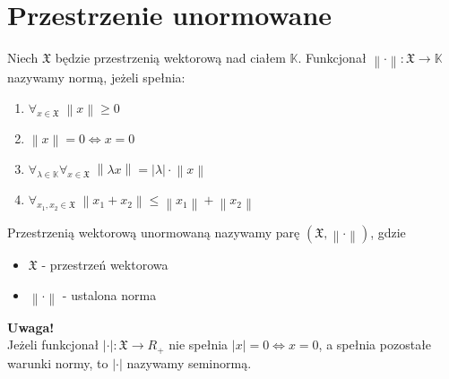 \section{Przestrzenie unormowane}
\begin{defi}[Norma]
Niech $ \mathfrak X $ będzie przestrzenią wektorową nad ciałem $ \mathbb K $. Funkcjonał $ \left\|\cdot \right\|:\mathfrak X\to \mathbb K $ nazywamy normą, jeżeli spełnia:
\begin{enumerate}
\item $ \forall_{x\in\mathfrak X}\; \left\|x\right\|\ge 0 $
\item $ \left\|x\right\|=0\Leftrightarrow x=0 $
\item $ \forall_{\lambda\in\mathbb K}\forall_{x\in \mathfrak X}\;\left\|\lambda x\right\|=\left|\lambda\right| \cdot \left\|x\right\|$
\item $ \forall_{x_1,x_2\in\mathfrak X}\;\left\|x_1+x_2\right\|\le \left\|x_1\right\| +\left\|x_2\right\|$
\end{enumerate}
\end{defi}
\begin{defi}
Przestrzenią wektorową unormowaną nazywamy parę $ \left(\mathfrak X,\left\|\cdot \right\|\right) $, gdzie
\begin{itemize}
\item $ \mathfrak X $ - przestrzeń wektorowa
\item $ \left\|\cdot \right\| $ - ustalona norma
\end{itemize}
\end{defi}
\textbf{Uwaga!}\\
Jeżeli funkcjonał $ \left|\cdot \right| :\mathfrak X\to R_+$ nie spełnia $ \left|x\right| =0\Leftrightarrow x=0$, a spełnia pozostałe warunki normy, to $ \left|\cdot \right| $ nazywamy seminormą.
